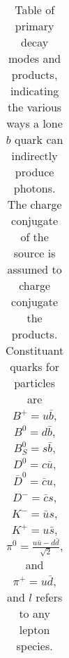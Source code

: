 \documentclass{article}
\DeclareMathOperator{\any}{\text{any}}
\begin{document}
\begin{table}
\begin{tabular}{lcclr}
\end{tabular}
\caption{
  Table of primary decay modes and products, indicating the various ways a lone $b$ quark can indirectly produce photons.
  The charge conjugate of the source is assumed to charge conjugate the products.
  Constituant quarks for particles are $B^+=u\bar{b}$, $B^0=d\bar{b}$, $B^0_S=s\bar{b}$, $D^0=c\bar{u}$, $\bar{D}^0=\bar{c}u$, $D^-=\bar{c}s$, $K^-=\bar{u}s$, $K^+=u\bar{s}$, $\pi^0=\frac{u\bar{u}-d\bar{d}}{\sqrt{2}}$, and $\pi^+=u\bar{d}$, and $l$ refers to any lepton species.
  }
\end{table}
\end{document}
